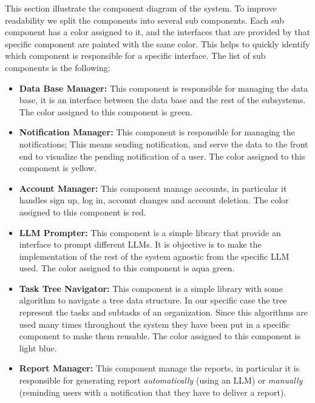 \documentclass{article}
\begin{document}
This section illustrate the component diagram of the system. To improve readability we split the components into several sub
components.
Each sub component has a color assigned to it, and the interfaces that are provided by that specific component are painted with the same color.
This helps to quickly identify which component is responsible for a specific interface.
\newline \newline
The list of sub components is the following:
\begin{itemize}
    \item \textcolor[HTML]{8CC86E}{\textbf{Data Base Manager: }} This component is responsible for managing the data base, it is an interface between
          the data base and the rest of the subsystems. The color assigned to this component is \textcolor[HTML]{8CC86E}{green}.
    \item \textcolor[HTML]{F0C832}{\textbf{Notification Manager: }} This component is responsible for managing the notifications;
          This means sending notification, and serve the data to the front end to visualize the pending notification of a user. The color assigned to this component is \textcolor[HTML]{F0C832}{yellow}.
    \item \textcolor[HTML]{FF0000}{\textbf{Account Manager: }} This component manage accounts, in particular it handles sign up, log in, account changes and account deletion.
          The color assigned to this component is \textcolor[HTML]{FF0000}{red}.
    \item \textcolor[HTML]{64C8BE}{\textbf{LLM Prompter: }} This component is a simple library that provide an interface to prompt different LLMs. It is objective is to make the
          implementation of the rest of the system agnostic from the specific LLM used. The color assigned to this component is \textcolor[HTML]{64C8BE}{aqua green}.
    \item \textcolor[HTML]{A0C8F0}{\textbf{Task Tree Navigator: }} This component is a simple library with some algorithm to navigate a tree data structure.
          In our specific case the tree represent the tasks and subtasks of an organization. Since this algorithms are used many
          times throughout the system they have been put in a specific component to make them reusable. The color assigned to this component is \textcolor[HTML]{A0C8F0}{light blue}.
    \item \textcolor[HTML]{FA9646}{\textbf{Report Manager: }} This component manage the reports, in particular it is responsible for generating report \textit{automatically} (using an LLM) or \textit{manually} (reminding users with a notification that they have to deliver a report).

\end{itemize}
\end{document}
